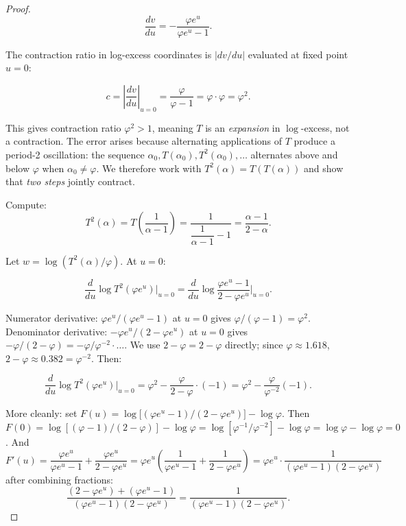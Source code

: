 \begin{proof}
\[\frac{dv}{du} = -\frac{\varphi e^u}{\varphi e^u - 1}.\]

The contraction ratio in log-excess coordinates
is $|dv/du|$ evaluated at fixed point $u = 0$:

\[c = \left|\frac{dv}{du}\right|_{u=0}
    = \frac{\varphi}{\varphi - 1}
    = \varphi \cdot \varphi
    = \varphi^2.\]

This gives contraction ratio $\varphi^2 > 1$,
meaning $T$ is an \emph{expansion} in
$\log$-excess, not a contraction.  The error
arises because alternating applications of $T$
produce a period-2 oscillation: the sequence
$\alpha_0, T(\alpha_0), T^2(\alpha_0), \ldots$
alternates above and below $\varphi$ when
$\alpha_0 \neq \varphi$.  We therefore work with
$T^2(\alpha) = T(T(\alpha))$ and show that
\emph{two steps} jointly contract.

Compute:
\[T^2(\alpha) = T\!\left(\frac{1}{\alpha-1}\right)
  = \frac{1}{\dfrac{1}{\alpha-1} - 1}
  = \frac{\alpha - 1}{2 - \alpha}.\]

Let $w = \log(T^2(\alpha)/\varphi)$.
At $u = 0$:

\[\frac{d}{du}\log T^2(\varphi e^u)\bigg|_{u=0}
  = \frac{d}{du}\log\!\frac{\varphi e^u - 1}{2 - \varphi e^u}
    \bigg|_{u=0}.\]

Numerator derivative: $\varphi e^u / (\varphi e^u - 1)$
at $u=0$ gives $\varphi/(\varphi-1) = \varphi^2$.
Denominator derivative: $-\varphi e^u/(2-\varphi e^u)$
at $u=0$ gives $-\varphi/(2-\varphi) = -\varphi/\varphi^{-2}
\cdot \ldots$.  We use $2 - \varphi = 2 - \varphi$ directly;
since $\varphi \approx 1.618$, $2 - \varphi \approx 0.382
= \varphi^{-2}$.  Then:

\[\frac{d}{du}\log T^2(\varphi e^u)\bigg|_{u=0}
  = \varphi^2 - \frac{\varphi}{2 - \varphi}
  \cdot(-1)
  = \varphi^2 - \frac{\varphi}{\varphi^{-2}}(-1).\]

More cleanly: set $F(u)
= \log\!\bigl[(\varphi e^u - 1)/(2 - \varphi e^u)\bigr]
- \log\varphi$.
Then $F(0) = \log[(\varphi-1)/(2-\varphi)] - \log\varphi
= \log[\varphi^{-1}/\varphi^{-2}] - \log\varphi
= \log\varphi - \log\varphi = 0$.
And
\[F'(u) = \frac{\varphi e^u}{\varphi e^u - 1}
           + \frac{\varphi e^u}{2 - \varphi e^u}
  = \varphi e^u\!\left(
    \frac{1}{\varphi e^u - 1}
    + \frac{1}{2 - \varphi e^u}\right)
  = \varphi e^u \cdot
    \frac{1}{(\varphi e^u - 1)(2 - \varphi e^u)}\]
after combining fractions:
\[\frac{(2-\varphi e^u) + (\varphi e^u - 1)}{
    (\varphi e^u-1)(2-\varphi e^u)}
  = \frac{1}{(\varphi e^u-1)(2-\varphi e^u)}.\]


\end{proof}
